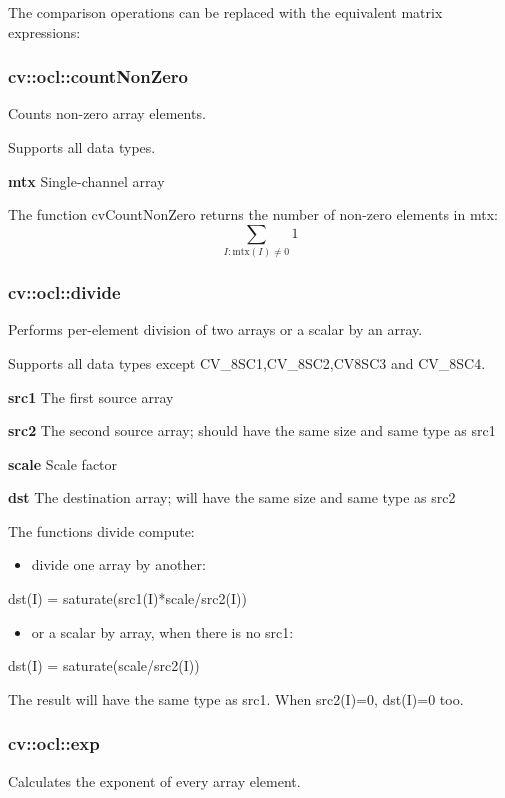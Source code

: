 \documentclass{article}
\begin{document}
The comparison operations can be replaced with the equivalent matrix
expressions:

\newpage

\subsubsection{cv::ocl::countNonZero }
\label{subsubsec:mylabel12}
Counts non-zero array elements.

Supports all data types.

\textbf{mtx }Single-channel array

The function cvCountNonZero returns the number of non-zero elements in mtx:
\[
\sum\limits_{I:\mbox{mtx}(I)\ne 0} 1
\]
\newpage

\subsubsection{cv::ocl::divide}
\label{subsubsec:mylabel13}
Performs per-element division of two arrays or a scalar by an array.

Supports all data types except CV{\_}8SC1,CV{\_}8SC2,CV8SC3 and CV{\_}8SC4.

\textbf{src1 }The first source array

\textbf{src2 }The second source array; should have the same size and same
type as src1

\textbf{scale }Scale factor

\textbf{dst }The destination array; will have the same size and same type as
src2

The functions divide compute:

\begin{itemize}
\item divide one array by another:
\end{itemize}
dst(I) = saturate(src1(I)*scale/src2(I))

\begin{itemize}
\item or a scalar by array, when there is no src1:
\end{itemize}
dst(I) = saturate(scale/src2(I))

The result will have the same type as src1. When src2(I)=0, dst(I)=0 too.

\newpage

\subsubsection{cv::ocl::exp }
\label{subsubsec:mylabel14}
Calculates the exponent of every array element.
\end{document}
